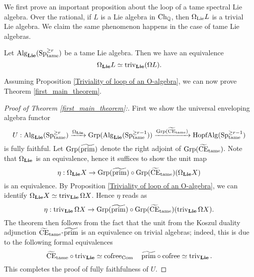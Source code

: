 We first prove an important proposition about the loop of a tame spectral Lie algebra.
Over the rational, if $L$ is a Lie algebra in $\operatorname{Ch}_{{\mathbb{Q}}}$, then $\Omega_{\operatorname{Lie}}L$ is a trivial Lie algebra.
We claim the same phenomenon happens in the case of tame Lie algebras.

\begin{proposition}
\label{Triviality of loop of an O-algebra}
	Let $\operatorname{Alg}_{\mathbf{Lie}}(\operatorname{Sp}^{\geq r}_{\operatorname{\operatorname{tame}}}) $ be a tame Lie algebra.
	Then we have an equivalence
	$$
	\Omega_{\mathbf{Lie}} L\simeq \operatorname{triv}_{\mathbf{Lie}}(\Omega L).
	$$ 
\end{proposition}

Assuming Proposition \ref{Triviality of loop of an O-algebra}, we can now prove Theorem \ref{first_main_theorem}.
\begin{proof}
[Proof of Theorem \ref{first_main_theorem}:]
	First we show the universal enveloping algebra functor
	\[
	U:
	\operatorname{Alg}_{\mathbf{Lie}}(\operatorname{Sp}^{\geq r}_{\operatorname{\operatorname{tame}}}) 
	\xrightarrow{\Omega_{\mathbf{Lie}}}
	\operatorname{Grp}(\operatorname{Alg}_{\mathbf{Lie}}(\operatorname{Sp}^{\geq r-1}_{\operatorname{\operatorname{tame}}}))
	\xrightarrow{\operatorname{Grp}(\widetilde{\operatorname{CE}}_{\operatorname{\operatorname{tame}}})}
	\operatorname{HopfAlg}(\operatorname{Sp}^{\geq r-1}_{\operatorname{\operatorname{tame}}})
	\]
	is fully faithful. 
    Let $\operatorname{Grp}(\widetilde{\operatorname{prim}})$ denote the right adjoint of
    $\operatorname{Grp}(\widetilde{\operatorname{CE}}_{\operatorname{\operatorname{tame}}})$. Note that $\Omega_{\mathbf{Lie}}$ is an equivalence, hence it suffices to show the unit map
    $$
    \eta:\Omega_{\mathbf{Lie}} X \to \operatorname{Grp}(\widetilde{\operatorname{prim}})\circ \operatorname{Grp}(\widetilde{\operatorname{CE}}_{\operatorname{\operatorname{tame}}}) (\Omega_{\mathbf{Lie}}X)
    $$
    is an equivalence.
    By Proposition \ref{Triviality of loop of an O-algebra}, we can identify $\Omega_{\mathbf{Lie}}X\simeq \operatorname{triv}_{\mathbf{Lie}} \Omega X $.
    Hence $\eta$ reads as 
    $$
    \eta: \operatorname{triv}_{\mathbf{Lie}} \Omega X \to 
    \operatorname{Grp}(\widetilde{\operatorname{prim}})\circ \operatorname{Grp}(\widetilde{\operatorname{CE}}_{\operatorname{\operatorname{tame}}}) (\operatorname{triv}_{\mathbf{Lie}} \Omega X).
    $$
    The theorem then follows from the fact that the unit from the Koszul duality adjunction $\widetilde{\operatorname{CE}}_{\operatorname{\operatorname{tame}}}$-$\widetilde{\operatorname{prim}}$ is an equivalence on trivial algebras; indeed, this is due to the following formal equivalences
    $$
    \widetilde{\operatorname{CE}}_{\operatorname{\operatorname{tame}}} \circ \operatorname{triv}_{\mathbf{Lie}} \simeq \operatorname{cofree}_{\operatorname{Com}} 
    \quad
    \widetilde{\operatorname{prim}} \circ \operatorname{cofree} \simeq \operatorname{triv}_{\mathbf{Lie}}.
    $$
    This completes the proof of fully faithfulness of $U$.
    

\end{proof}
